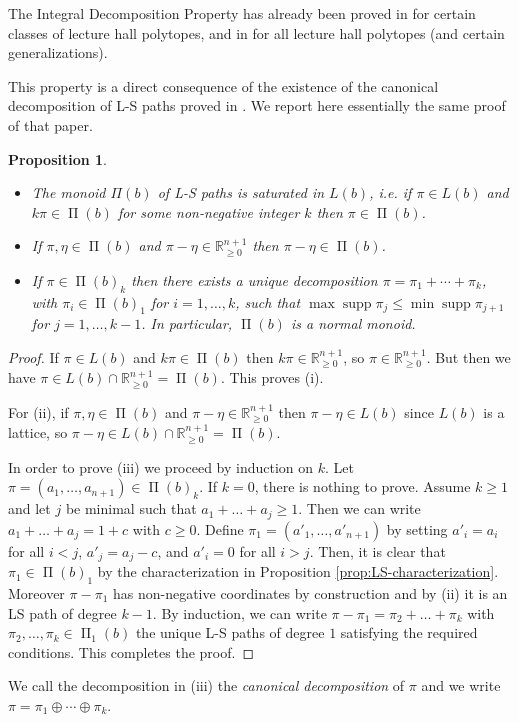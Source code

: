 \documentclass[12pt, a4paper]{amsart}   	%
\numberwithin{equation}{section}
\theoremstyle{plain}
\newtheorem{proposition}[theorem]{Proposition}
\theoremstyle{definition}
\DeclareMathOperator{\LS}{\Pi}
\DeclareMathOperator{\supp}{supp}
\newcommand{\RR}{\mathbb{R}}
\begin{document}
The Integral Decomposition Property has already been proved in \cite{HibiOlsenTsuchiya} for certain classes of lecture hall polytopes, and in \cite{BrandenSolus} for all lecture hall polytopes (and certain generalizations).

This property is a direct consequence of the existence of the canonical decomposition of L-S paths proved in \cite{Chirivi}. We report here essentially the same proof of that paper.

\begin{proposition}\label{prop:ls-normality}
\begin{itemize}
\item[(i)] The monoid $\Pi(b)$ of L-S paths is saturated in $L(b)$, i.e. if $\pi\in L(b)$ and $k\pi\in\LS(b)$ for some non-negative integer $k$ then $\pi\in\LS(b)$.
\item[(ii)] If $\pi,\eta\in\LS(b)$ and $\pi - \eta\in\RR^{n+1}_{\ge0}$ then $\pi - \eta\in\LS(b)$.
\item[(iii)] If $\pi\in \LS(b)_k$ then there exists a unique decomposition $\pi = \pi_1 + \cdots + \pi_k$, with $\pi_i\in\LS(b)_1$ for $i=1,\ldots,k$, such that $\max\supp\pi_j\leq \min\supp\pi_{j+1}$ for $j=1,\ldots,k-1$. In particular, $\LS(b)$ is a normal monoid.
\end{itemize} 
\end{proposition}
\begin{proof}
If $\pi\in L(b)$ and $k\pi\in\LS(b)$ then $k\pi\in\RR^{n+1}_{\ge0}$, so $\pi\in\RR^{n+1}_{\ge0}$. But then we have $\pi\in L(b)\cap \RR^{n+1}_{\ge0} = \LS(b)$. This proves \textrm{(i)}.

For \textrm{(ii)}, if $\pi,\eta\in\LS(b)$ and $\pi - \eta\in\RR^{n+1}_{\ge0}$ then $\pi - \eta\in L(b)$ since $L(b)$ is a lattice, so $\pi - \eta\in L(b)\cap \RR^{n+1}_{\ge0} = \LS(b)$.

In order to prove \textrm{(iii)} we proceed by induction on $k$. Let $\pi = (a_1, \ldots, a_{n+1})\in\LS(b)_k$. If $k = 0$, there is nothing to prove. Assume $k \geq 1$ and let $j$ be minimal such that $a_1 + \ldots + a_j \geq 1$. Then we can write $a_1 + \ldots + a_j = 1 + c$ with $c\geq 0$. Define $\pi_1 = (a'_1, \ldots, a'_{n+1})$ by setting $a'_i = a_i$ for all $i < j$, $a'_j = a_j - c$, and $a'_i = 0$ for all $i > j$. Then, it is clear that $\pi_1\in\LS(b)_1$ by the characterization in Proposition \ref{prop:LS-characterization}. Moreover $\pi - \pi_1$ has non-negative coordinates by construction and by \textrm{(ii)} it is an LS path of degree $k-1$. By induction, we can write $\pi - \pi_1 = \pi_2 + \ldots + \pi_k$ with $\pi_2, \ldots, \pi_k\in\LS_1(b)$ the unique L-S paths of degree $1$ satisfying the required conditions. This completes the proof.
\end{proof}
We call the decomposition in \textrm{(iii)} the \emph{canonical decomposition} of $\pi$ and we write $\pi = \pi_1 \oplus \cdots \oplus \pi_k$.
\end{document}
